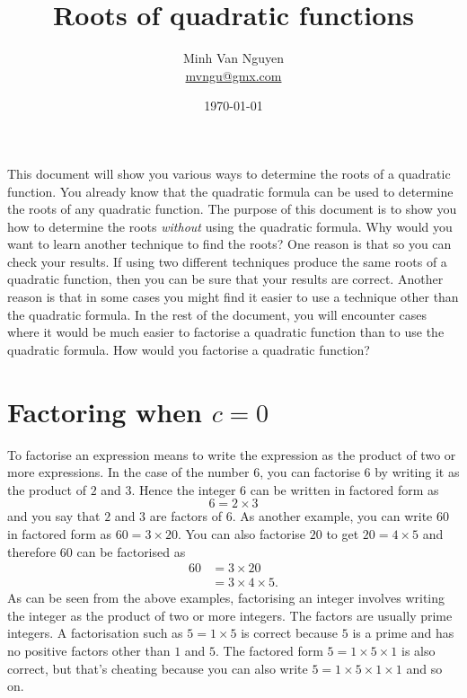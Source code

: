 \documentclass[a4paper,oneside,12pt]{article}
\begin{document}
\title{\Large\bf Roots of quadratic functions}
\author{%
  Minh Van Nguyen \\
  \url{mvngu@gmx.com}
}
\date{\today}
\maketitle

\noindent
This document will show you various ways to determine the roots of a
quadratic function.  You already know that the quadratic formula can
be used to determine the roots of any quadratic function.  The purpose
of this document is to show you how to determine the roots
\emph{without} using the quadratic formula.  Why would you want to
learn another technique to find the roots?  One reason is that so you
can check your results.  If using two different techniques produce the
same roots of a quadratic function, then you can be sure that your
results are correct.  Another reason is that in some cases you might
find it easier to use a technique other than the quadratic formula.
In the rest of the document, you will encounter cases where it would
be much easier to factorise a quadratic function than to use the
quadratic formula.  How would you factorise a quadratic function?



\section{Factoring when $c = 0$}

To factorise an expression means to write the expression as the
product of two or more expressions.  In the case of the number $6$,
you can factorise $6$ by writing it as the product of $2$ and $3$.
Hence the integer $6$ can be written in factored form as
\[
6
=
2 \times 3
\]
and you say that $2$ and $3$ are factors of $6$.  As another example,
you can write $60$ in factored form as $60 = 3 \times 20$.  You can
also factorise $20$ to get $20 = 4 \times 5$ and therefore $60$ can be
factorised as
\begin{align*}
60
&=
3 \times 20 \\[4pt]
&=
3 \times 4 \times 5.
\end{align*}
As can be seen from the above examples, factorising an integer
involves writing the integer as the product of two or more integers.
The factors are usually prime integers.  A factorisation such as
$5 = 1 \times 5$ is correct because $5$ is a prime and has no positive
factors other than $1$ and $5$.  The factored form
$5 = 1 \times 5 \times 1$ is also correct, but that's cheating because
you can also write $5 = 1 \times 5 \times 1 \times 1$ and so on.
\end{document}
